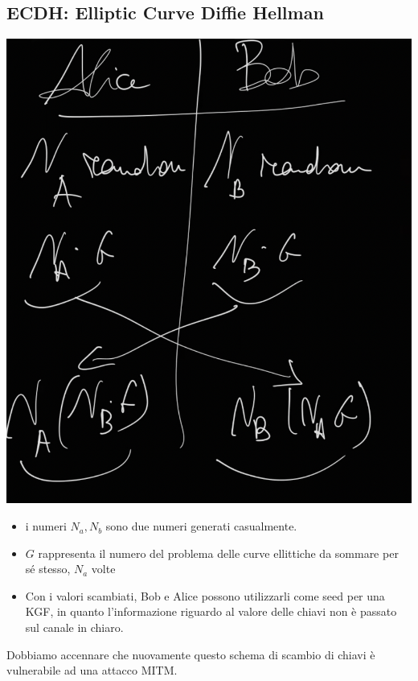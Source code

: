 \documentclass[11pt, oneside]{article}   	%
\begin{document}
\subsection*{ECDH: Elliptic Curve Diffie Hellman}
\begin{center}
\includegraphics[scale= 0.3]{ecdh}
\end{center}
\begin{itemize}
\item i numeri $N_a, N_b$ sono due numeri generati casualmente.
\item $G$ rappresenta il numero del problema delle curve ellittiche da sommare per sé stesso, $N_a$ volte
\item Con i valori scambiati, Bob e Alice possono utilizzarli come seed per una KGF, in quanto l'informazione riguardo al valore delle chiavi non è passato sul canale in chiaro.
\end{itemize}
Dobbiamo accennare che nuovamente questo schema di scambio di chiavi è vulnerabile ad una attacco MITM.
\end{document}
